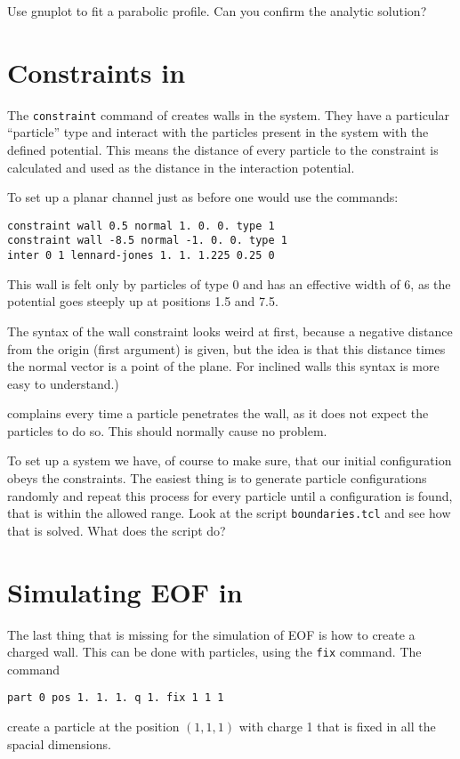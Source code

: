 Use gnuplot to fit a parabolic profile. Can you confirm the analytic solution?

\section{Constraints in \ES{}}
The \lstinline|constraint| command of \ES{} creates walls in the system.
They have a particular ``particle'' type and interact with the particles
present in the system with the defined potential. This means the distance
of every particle to the constraint is calculated and used as the distance 
in the interaction potential.

To set up a planar channel just as before one would use the commands:
\begin{lstlisting}[numbers=none]
constraint wall 0.5 normal 1. 0. 0. type 1
constraint wall -8.5 normal -1. 0. 0. type 1
inter 0 1 lennard-jones 1. 1. 1.225 0.25 0
\end{lstlisting}
This wall is felt only by particles of type 0 and has an effective width
of 6, as the potential goes steeply up at positions 1.5 and 7.5.

The syntax of the wall constraint looks weird at first, because a negative
distance from the origin (first argument) is given, but the idea is that
this distance times the normal vector is a point of the plane. For inclined
walls this syntax is more easy to understand.)

\ES{} complains every time a particle penetrates the wall, as it does not
expect the particles to do so. This should normally cause no problem. 

To set up a system we have, of course to make sure, that our initial
configuration obeys the constraints. The easiest thing is to 
generate particle configurations randomly and repeat this process
for every particle until a configuration is found, that
is within the allowed range. Look at the script \lstinline|boundaries.tcl|
and see how that is solved. What does the script do?

\section{Simulating EOF in \ES{}}
The last thing that is missing for the simulation of EOF is
how to create a charged wall. This can be done with
particles, using the \lstinline|fix| command. The command
\begin{lstlisting}[numbers=none]
part 0 pos 1. 1. 1. q 1. fix 1 1 1
\end{lstlisting}
create a particle at the position $\left(1,1,1\right)$ with
charge 1 that is fixed in all the spacial dimensions.

